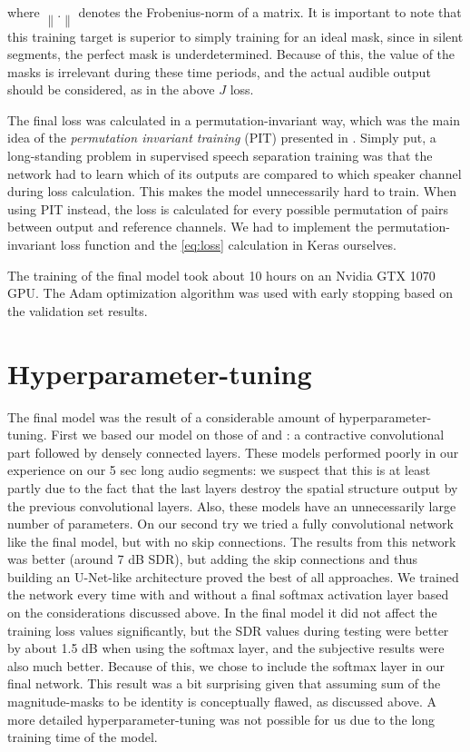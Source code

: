 \documentclass{article}
\begin{document}
where $\left\lVert . \right\rVert$ denotes the Frobenius-norm of a matrix. It is important to note that this training target is superior to simply training for an ideal mask, since in silent segments, the perfect mask is underdetermined. Because of this, the value of the masks is irrelevant during these time periods, and the actual audible output should be considered, as in the above $J$ loss.

The final loss was calculated in a permutation-invariant way, which was the main idea of the \textit{permutation invariant training} (PIT) presented in \cite{YuKTJ16}. Simply put, a long-standing problem in supervised speech separation training was that the network had to learn which of its outputs are compared to which speaker channel during loss calculation. This makes the model unnecessarily hard to train. When using PIT instead, the loss is calculated for every possible permutation of pairs between output and reference channels. We had to implement the permutation-invariant loss function and the \eqref{eq:loss} calculation in Keras ourselves.

The training of the final model took about 10 hours on an Nvidia GTX 1070 GPU. The Adam optimization algorithm was used with early stopping based on the validation set results.

\section{Hyperparameter-tuning}
The final model was the result of a considerable amount of hyperparameter-tuning. First we based our model on those of \cite{YuKTJ16} and \cite{Chandna17}: a contractive convolutional part followed by densely connected layers. These models performed poorly in our experience on our 5 sec long audio segments: we suspect that this is at least partly due to the fact that the last layers destroy the spatial structure output by the previous convolutional layers. Also, these models have an unnecessarily large number of parameters. On our second try we tried a fully convolutional network like the final model, but with no skip connections. The results from this network was better (around 7 dB SDR), but adding the skip connections and thus building an U-Net-like architecture proved the best of all approaches. We trained the network every time with and without a final softmax activation layer based on the considerations discussed above. In the final model it did not affect the training loss values significantly, but the SDR values during testing were better by about 1.5 dB when using the softmax layer, and the subjective results were also much better. Because of this, we chose to include the softmax layer in our final network. This result was a bit surprising given that assuming sum of the magnitude-masks to be identity is conceptually flawed, as discussed above. A more detailed hyperparameter-tuning was not possible for us due to the long training time of the model.
\end{document}
